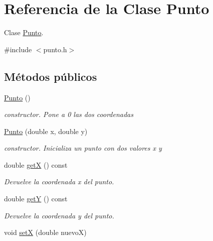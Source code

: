 \hypertarget{classPunto}{}\section{Referencia de la Clase Punto}
\label{classPunto}


Clase \hyperlink{classPunto}{Punto}.  




{\ttfamily \#include $<$punto.\+h$>$}

\subsection*{Métodos públicos}
\begin{DoxyCompactItemize}
\item 
\hyperlink{classPunto_a4b8b70b933ff13493ee5ddb3c8532c10}{Punto} ()\hypertarget{classPunto_a4b8b70b933ff13493ee5ddb3c8532c10}{}\label{classPunto_a4b8b70b933ff13493ee5ddb3c8532c10}

\begin{DoxyCompactList}\small\item\em constructor. Pone a 0 las dos coordenadas \end{DoxyCompactList}\item 
\hyperlink{classPunto_a911bb8d88eaa1f9904a27b0e159a51c0}{Punto} (double x, double y)\hypertarget{classPunto_a911bb8d88eaa1f9904a27b0e159a51c0}{}\label{classPunto_a911bb8d88eaa1f9904a27b0e159a51c0}

\begin{DoxyCompactList}\small\item\em constructor. Inicializa un punto con dos valores x y \end{DoxyCompactList}\item 
double \hyperlink{classPunto_aa218292fec9bad5ec6d71d4bd9173d9d}{getX} () const \hypertarget{classPunto_aa218292fec9bad5ec6d71d4bd9173d9d}{}\label{classPunto_aa218292fec9bad5ec6d71d4bd9173d9d}

\begin{DoxyCompactList}\small\item\em Devuelve la coordenada x del punto. \end{DoxyCompactList}\item 
double \hyperlink{classPunto_a214978b8bbae48ca5927f2e56fb3bd22}{getY} () const \hypertarget{classPunto_a214978b8bbae48ca5927f2e56fb3bd22}{}\label{classPunto_a214978b8bbae48ca5927f2e56fb3bd22}

\begin{DoxyCompactList}\small\item\em Devuelve la coordenada y del punto. \end{DoxyCompactList}\item 
void \hyperlink{classPunto_a51ae6616f828bb2b4111bc8ace49dbca}{setX} (double nuevoX)\hypertarget{classPunto_a51ae6616f828bb2b4111bc8ace49dbca}{}\label{classPunto_a51ae6616f828bb2b4111bc8ace49dbca}


\end{DoxyCompactItemize}

